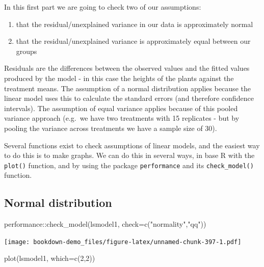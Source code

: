 \documentclass[
]{book}
\newenvironment{Shaded}{\begin{snugshade}}{\end{snugshade}}
\newcommand{\AttributeTok}[1]{\textcolor[rgb]{0.77,0.63,0.00}{#1}}
\newcommand{\DecValTok}[1]{\textcolor[rgb]{0.00,0.00,0.81}{#1}}
\newcommand{\FunctionTok}[1]{\textcolor[rgb]{0.00,0.00,0.00}{#1}}
\newcommand{\NormalTok}[1]{#1}
\newcommand{\SpecialCharTok}[1]{\textcolor[rgb]{0.00,0.00,0.00}{#1}}
\newcommand{\StringTok}[1]{\textcolor[rgb]{0.31,0.60,0.02}{#1}}
\begin{document}
In this first part we are going to check two of our assumptions:

\begin{enumerate}
\def\labelenumi{\arabic{enumi})}
\item
  that the residual/unexplained variance in our data is approximately normal
\item
  that the residual/unexplained variance is approximately equal between our groups
\end{enumerate}

Residuals are the differences between the observed values and the fitted values produced by the model - in this case the heights of the plants against the treatment means. The assumption of a normal distribution applies because the linear model uses this to calculate the standard errors (and therefore confidence intervals). The assumption of equal variance applies because of this pooled variance approach (e.g.~we have two treatments with 15 replicates - but by pooling the variance across treatments we have a sample size of 30).

Several functions exist to check assumptions of linear models, and the easiest way to do this is to make graphs. We can do this in several ways, in base R with the \texttt{plot()} function, and by using the package \texttt{performance} and its \texttt{check\_model()} function.

\hypertarget{normal-distribution-1}{%
\subsection{Normal distribution}\label{normal-distribution-1}}

\begin{Shaded}
\begin{Highlighting}[]
\NormalTok{performance}\SpecialCharTok{::}\FunctionTok{check\_model}\NormalTok{(lsmodel1, }\AttributeTok{check=}\FunctionTok{c}\NormalTok{(}\StringTok{"normality"}\NormalTok{,}\StringTok{"qq"}\NormalTok{))}
\end{Highlighting}
\end{Shaded}

\texttt{[image: bookdown-demo\_files/figure-latex/unnamed-chunk-397-1.pdf]}

\begin{Shaded}
\begin{Highlighting}[]
\FunctionTok{plot}\NormalTok{(lsmodel1, }\AttributeTok{which=}\FunctionTok{c}\NormalTok{(}\DecValTok{2}\NormalTok{,}\DecValTok{2}\NormalTok{))}
\end{Highlighting}
\end{Shaded}
\end{document}

